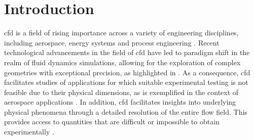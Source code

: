 \chapter{Introduction}
\label{chap:introduction}

\Acrfull{cfd} is a field of rising importance across a variety of engineering disciplines, including  aerospace, energy systems and process engineering \citep{versteeg_introduction_2007}.
Recent technological advancements in the field of \acrshort{cfd} have led to paradigm shift in the realm of fluid dynamics simulations, allowing for the exploration of   complex geometries with exceptional precision, as highlighted in \citep{slotnick_cfd_2014}.
As a consequence, \acrshort{cfd} facilitates studies of applications for which suitable experimental testing is not feasible due to their physical dimensions, as is exemplified in the context of  aerospace applications \citep{slotnick_cfd_2014}.
In addition, \acrshort{cfd}  facilitates insights into underlying physical phenomena through a detailed resolution of the entire flow field. This provides access to quantities that are difficult or impossible to obtain experimentally \citep{versteeg_introduction_2007}.

